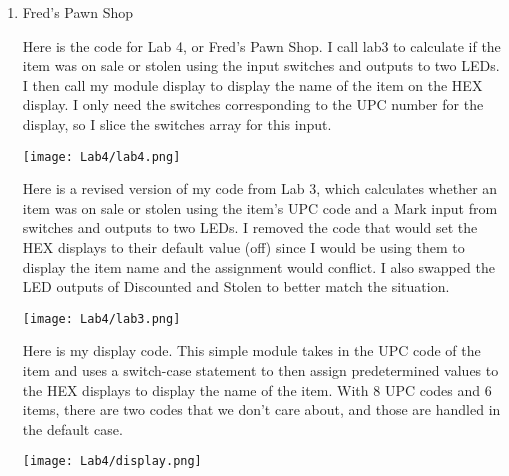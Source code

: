 \documentclass{article}
\newenvironment{solution}{\begin{mdframed}[style=SolutionFrame]}{\end{mdframed}}
\newenvironment{enum}{\begin{enumerate}[label={(\alph*)}]}{\end{enumerate}}
\begin{document}
\begin{enum}
        \newpage
        \item Fred's Pawn Shop
            \begin{solution}
                Here is the code for Lab 4, or Fred's Pawn Shop. I call lab3 to calculate if the item was on sale or stolen using the input switches and outputs to two LEDs. I then call my module display to display the name of the item on the HEX display. I only need the switches corresponding to the UPC number for the display, so I slice the switches array for this input. \\
                \begin{minipage}[t]{0.9\linewidth}
                    \begin{center}
                        \texttt{[image: Lab4/lab4.png]}
                    \end{center}
                \end{minipage}

                Here is a revised version of my code from Lab 3, which calculates whether an item was on sale or stolen using the item's UPC code and a Mark input from switches and outputs to two LEDs. I removed the code that would set the HEX displays to their default value (off) since I would be using them to display the item name and the assignment would conflict. I also swapped the LED outputs of Discounted and Stolen to better match the situation. \\
                \begin{minipage}[t]{0.9\linewidth}
                    \begin{center}
                        \texttt{[image: Lab4/lab3.png]}
                    \end{center}
                \end{minipage}

                Here is my display code. This simple module takes in the UPC code of the item and uses a switch-case statement to then assign predetermined values to the HEX displays to display the name of the item. With 8 UPC codes and 6 items, there are two codes that we don't care about, and those are handled in the default case. \\
                \begin{minipage}[t]{0.9\linewidth}
                    \begin{center}
                        \texttt{[image: Lab4/display.png]}
                    \end{center}
                \end{minipage}


\end{solution}
\end{enum}
\end{document}
